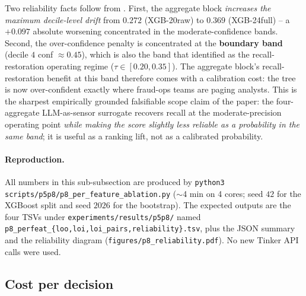 Two reliability facts follow from . First,
the aggregate block \emph{increases the maximum decile-level drift}
from $0.272$ (XGB-20raw) to $0.369$ (XGB-24full) -- a
$+0.097$ absolute worsening concentrated in the moderate-confidence
bands. Second, the over-confidence penalty is concentrated at the
\textbf{boundary band} (decile $4$ conf $\approx 0.45$), which is
also the band that
 identified as the recall-restoration
operating regime ($\tau \in [0.20, 0.35]$). The aggregate block's
recall-restoration benefit at this band therefore comes with a
calibration cost: the tree is now over-confident exactly where
fraud-ops teams are paging analysts. This is the
sharpest empirically grounded falsifiable scope claim of the paper:
the four-aggregate LLM-as-sensor surrogate recovers recall at the
moderate-precision operating point \emph{while making the score
slightly less reliable as a probability in the same band}; it is
useful as a ranking lift, not as a calibrated probability.

\paragraph{Reproduction.} All numbers in this sub-subsection are produced
by \texttt{python3 scripts/p5p8/p8\_per\_feature\_ablation.py}
($\sim$4 min on 4 cores; seed $42$ for the XGBoost split and seed
$2026$ for the bootstrap). The expected outputs are the four TSVs
under \texttt{experiments/results/p5p8/} named
\texttt{p8\_perfeat\_\{loo,loi,loi\_pairs,reliability\}.tsv}, plus
the JSON summary and the reliability diagram
(\texttt{figures/p8\_reliability.pdf}). No new Tinker API calls were
used.

\subsection{Cost per decision}

